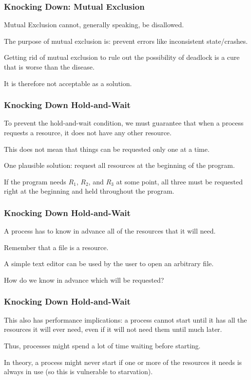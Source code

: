 \begin{frame}
	\frametitle{Knocking Down: Mutual Exclusion}

	Mutual Exclusion cannot, generally speaking, be disallowed.

	The purpose of  mutual exclusion is: prevent errors like inconsistent state/crashes.

	Getting rid of mutual exclusion to rule out the possibility of deadlock is a cure that is worse than the disease.

	It is therefore not acceptable as a solution.


\end{frame}

\begin{frame}
	\frametitle{Knocking Down Hold-and-Wait}
	To prevent the hold-and-wait condition, we must guarantee that when a process requests a resource, it does not have any other resource.

	This does not mean that things can be requested only one at a time.

	One plausible solution: request all resources at the beginning of the program.

	If the program needs $R_{1}$, $R_{2}$, and $R_{3}$ at some point, all three must be requested right at the beginning and held throughout the program.

\end{frame}

\begin{frame}
	\frametitle{Knocking Down Hold-and-Wait}

	A process has to know in advance all of the resources that it will need.

	Remember that a file is a resource.

	A simple text editor can be used by the user to open an arbitrary file.

	How do we know in advance which will be requested?

\end{frame}

\begin{frame}
	\frametitle{Knocking Down Hold-and-Wait}

	This also has performance implications: a process cannot start until it has all the resources it will ever need, even if it will not need them until much later.

	Thus, processes might spend a lot of time waiting before starting.

	In theory, a process might never start if one or more of the resources it needs is always in use (so this is vulnerable to starvation).


\end{frame}


